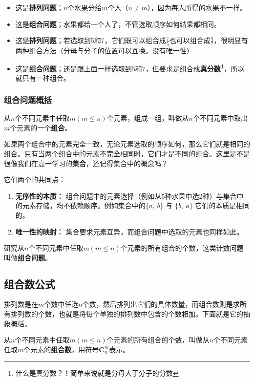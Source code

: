 \documentclass[a5paper]{article}
\begin{document}
\leftline{{\color{blue} {\large 解答}}}
\begin{itemize}
    \item 这是\textbf{排列问题}；$n$个水果分给$m$个人（$n \ne m$），因为每人所得的水果不一样。
    \item 这是\textbf{组合问题}；水果都给一个人了，不管选取顺序如何结果都相同。%
    \item 这是\textbf{排列问题}；若选取到5和7，它们既可以组合成$\frac{7}{5}$也可以组合成$\frac{5}{7}$，很明显有两种组合方法（分母与分子的位置可以互换。没有唯一性）
    \item 这是\textbf{组合问题}；还是跟上面一样选取到5和7，但要求是组合成\textbf{真分数\footnote{什么是真分数？！简单来说就是分母大于分子的分数}}，所以就只有一种组合。
\end{itemize}

\subsubsection{组合问题概括}
从$n$个不同元素中任取$m(m \le n)$个元素，组成一组，叫做从$n$个不同元素中取出$m$个元素的一个\textbf{组合}。

如果两个组合中的元素完全一致，无论元素选取的顺序如何，那么它们就是相同的组合。只有当两个组合中的元素不完全相同时，它们才是不同的组合。这里是不是很像我们在高一学习的\textbf{集合}，还记得集合中的概念吗？

它们两个的共同点：
\begin{enumerate}
    \item \textbf{无序性的本质：} 组合问题中的元素选择（例如从5种水果中选2种）与集合中的元素存储，均不依赖顺序。例如集合中的$\{ a,~b\}$ 与 $\{ b,~a\}$ 它们的本质是相同的。
    \item \textbf{唯一性的映射：} 集合要求元素互异，而组合问题中选取的元素也同样如此。
\end{enumerate}
研究从$n$个不同元素中任取$m(m \le n)$个元素的所有组合的个数，这类计数问题叫做\textbf{组合问题}。

\subsection{组合数公式}

排列数是在$m$个数中任选$n$个数，然后排列出它们的具体数量，而组合数则是求所有排列数的个数，也就是将每个单独的排列数中包含的个数相加。下面就是它的抽象概括。

从$n$个不同元素中任取$m(m \le n)$个元素的所有组合的个数，叫做从$n$个不同元素任取$m$个元素的\textbf{组合数}，用符号$\textbf{C}_{n}^{m}$表示。
\end{document}
